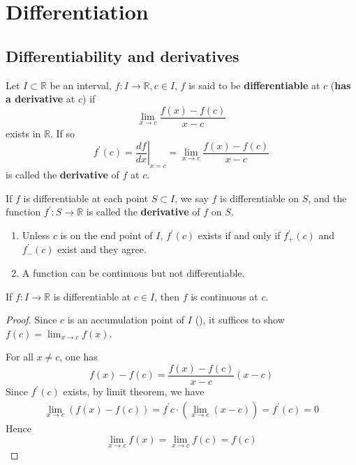 \section{Differentiation}

\subsection{Differentiability and derivatives}
\begin{definition}[Differentiability]
    Let $I \subset \mathbb{R}$ be an interval, 
    $f: I \to \mathbb{R}, c \in I$, 
    $f$ is said to be \textbf{differentiable} at $c$ 
    (\textbf{has a derivative} at $c$)
    if 
    \[
        \lim_{x \to c} \frac{f(x) - f(c)}{x-c} 
    \]
    exists in $\mathbb{R}$. 
    If so
    \[
    f^{\prime}(c) = 
    \left. \frac{df}{dx} \right|_{x= c}^{}  = 
    \lim_{x \to c} \frac{f(x) - f(c)}{x-c}
    \]
    is called the \textbf{derivative} of $f$ at $c$. 
    \medskip

    If $f$ is differentiable at each point $S \subset I$, 
    we say $f$ is differentiable on $S$, and the function 
    $f^{\prime}: S \to \mathbb{R}$ is called the 
    \textbf{derivative} of $f$ on $S$.
\end{definition}

\begin{example}
\end{example}

\begin{remark}
    \hfill
    \begin{enumerate}
        \item  Unless $c$ is on the end point of $I$, $f^{\prime}(c)$  exists 
        if and only if $f^{\prime}_{+}(c)$ and $f^{\prime}_{-}(c)$ exist and
        they agree.
        \item A function can be continuous but not differentiable.
    \end{enumerate} 
\end{remark}

\begin{theorem}
    If $f: I \to \mathbb{R}$ is differentiable at $c \in I$,
    then $f$ is continuous at $c$. 
\end{theorem}

\begin{proof}
    Since $c$ is an accumulation point of $I$ (),
    it suffices to show $f(c) = \lim_{x \to c}f(x)$. 
    \medskip

    For all $x \neq c$, one has 
    \[
        f(x) - f(c) = \frac{f(x) - f(c)}{x-c} (x-c)
    \]
    Since $f^{\prime}(c)$ exists, by limit theorem,
    we have 
    \begin{align*}
        \lim_{x \to c} \left( f(x) - f(c) \right) 
        = f^{\prime}c \cdot \left( \lim_{x \to c}(x-c) \right) 
        = f^{\prime}(c) = 0
    \end{align*}
    Hence
    \[
        \lim_{x \to c} f(x) = \lim_{x \to c}f(c) = f(c)
    \]
\end{proof}

